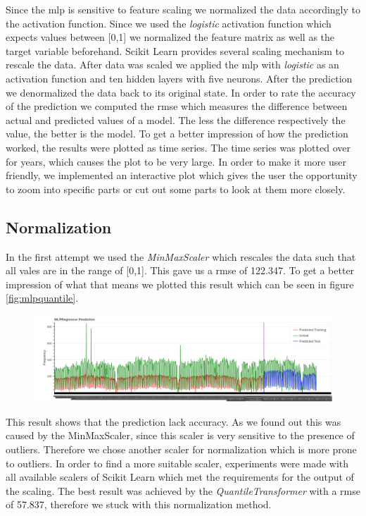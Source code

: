 Since the \acs{mlp} is sensitive to feature scaling we normalized the data accordingly to the activation function. Since we used the \emph{logistic} activation function which expects values between [0,1] we normalized the feature matrix as well as the target variable beforehand. Scikit Learn provides several scaling mechanism to rescale the data. 
After data was scaled we applied the \acs{mlp} with \emph{logistic} as an activation function and ten hidden layers with five neurons. After the prediction we denormalized the data back to its original state. In order to rate the accuracy of the prediction we computed the \acf{rmse} which measures the difference between actual and predicted values of a model. The less the difference respectively the value, the better is the model.
To get a better impression of how the prediction worked, the results were plotted as time series.
The time series was plotted over for years, which causes the plot to be very large. In order to make it more user friendly, we implemented an interactive plot which gives the user the opportunity to zoom into specific parts or cut out some parts to look at them more closely.
\subsection{Normalization}\label{sec:normalization}
In the first attempt we used the \emph{MinMaxScaler} which rescales the data such that all vales are in the range of [0,1].
This gave us a \acs{rmse} of 122.347. To get a better impression of what that means we plotted this result which can be seen in figure \ref{fig:mlpquantile}.
\begin{figure}[H]
\hspace{-2.8cm}
\includegraphics[width=1.4\textwidth]{img/mlpminmax}\label{fig:mlpminmax}
\label{fig:mlpminmax}
\end{figure}
This result shows that the prediction lack accuracy. As we found out this was caused by the MinMaxScaler, since this scaler is very sensitive to the presence of outliers. Therefore we chose another scaler for normalization which is more prone to outliers. In order to find a more suitable scaler, experiments were made with all available scalers of Scikit Learn which met the requirements for the output of the scaling. The best result was achieved by the \emph{QuantileTransformer} with a \acs{rmse} of 57.837, therefore we stuck with this normalization method.

